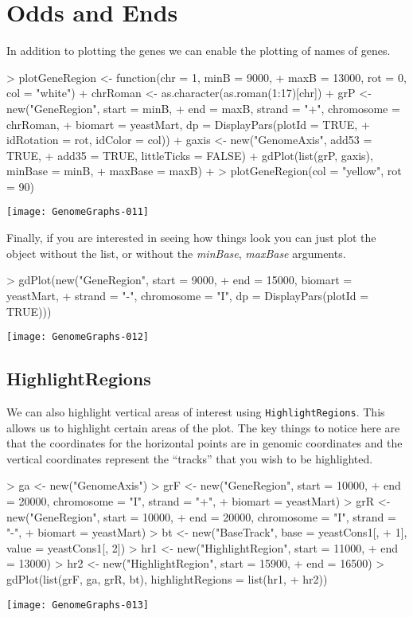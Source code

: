 \documentclass[11pt]{article}
\begin{document}
\section{Odds and Ends}
In addition to plotting the genes we can enable the plotting of names of genes. 

\begin{Schunk}
\begin{Sinput}
> plotGeneRegion <- function(chr = 1, minB = 9000, 
+     maxB = 13000, rot = 0, col = "white") {
+     chrRoman <- as.character(as.roman(1:17)[chr])
+     grP <- new("GeneRegion", start = minB, 
+         end = maxB, strand = "+", chromosome = chrRoman, 
+         biomart = yeastMart, dp = DisplayPars(plotId = TRUE, 
+             idRotation = rot, idColor = col))
+     gaxis <- new("GenomeAxis", add53 = TRUE, 
+         add35 = TRUE, littleTicks = FALSE)
+     gdPlot(list(grP, gaxis), minBase = minB, 
+         maxBase = maxB)
+ }
> plotGeneRegion(col = "yellow", rot = 90)
\end{Sinput}
\end{Schunk}
\texttt{[image: GenomeGraphs-011]}

Finally, if you are interested in seeing how things look you can just
plot the object without the list, or without the \emph{minBase}, \emph{maxBase}
arguments. 
\begin{Schunk}
\begin{Sinput}
> gdPlot(new("GeneRegion", start = 9000, 
+     end = 15000, biomart = yeastMart, 
+     strand = "-", chromosome = "I", dp = DisplayPars(plotId = TRUE)))
\end{Sinput}
\end{Schunk}
\texttt{[image: GenomeGraphs-012]}

\subsection{HighlightRegions} 
We can also highlight vertical areas of interest using
\texttt{HighlightRegions}. This allows us to highlight certain areas
of the plot. The key things to notice here are that the coordinates
for the horizontal points are in genomic coordinates and the vertical
coordinates represent the ``tracks'' that you wish to be highlighted. 

\begin{Schunk}
\begin{Sinput}
> ga <- new("GenomeAxis")
> grF <- new("GeneRegion", start = 10000, 
+     end = 20000, chromosome = "I", strand = "+", 
+     biomart = yeastMart)
> grR <- new("GeneRegion", start = 10000, 
+     end = 20000, chromosome = "I", strand = "-", 
+     biomart = yeastMart)
> bt <- new("BaseTrack", base = yeastCons1[, 
+     1], value = yeastCons1[, 2])
> hr1 <- new("HighlightRegion", start = 11000, 
+     end = 13000)
> hr2 <- new("HighlightRegion", start = 15900, 
+     end = 16500)
> gdPlot(list(grF, ga, grR, bt), highlightRegions = list(hr1, 
+     hr2))
\end{Sinput}
\end{Schunk}
\texttt{[image: GenomeGraphs-013]}
\end{document}
